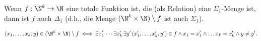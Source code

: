 
\begin{exercise}[220]

\phantom{}
	Wenn $f: \N^k \to \N$ eine totale Funktion ist, die (als Relation) eine $\Sigma_1$-Menge ist, dann ist $f$ auch $\Delta_1$ (d.h., die Menge $(\N^k \times \N) \setminus f$ ist auch $\Sigma_1$).

\end{exercise}


\begin{solution}

\begin{align*}
	(x_1,\dots,x_k,y) \in (\N^k \times \N) \setminus f \iff
	\exists x^{\prime}_1\, \cdots \exists x^{\prime}_k\, \exists  y^{\prime}\,
	(x^{\prime}_1,\dots,x^{\prime}_k,y^{\prime}) \in f \land x_1 = x^{\prime}_1
	\land \dots x_k = x^{\prime}_k \land y \neq y^{\prime}.
\end{align*}

\end{solution}
